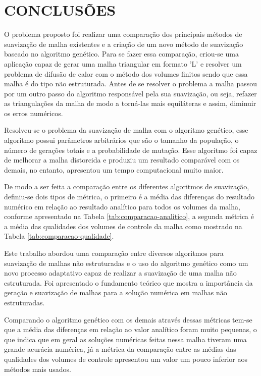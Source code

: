 \chapter[CONCLUSÕES]{CONCLUSÕES}

O problema proposto foi realizar uma comparação dos principais métodos de suavização de malha existentes e a criação de um novo método de suavização baseado no algoritmo genético. Para se fazer essa comparação, criou-se uma aplicação capaz de gerar uma malha triangular em formato 'L' e resolver um problema de difusão de calor com o método dos volumes finitos sendo que essa malha é do tipo não estruturada. Antes de se resolver o problema a malha passou por um outro passo do algoritmo responsável pela sua suavização, ou seja, refazer as triangulações da malha de modo a torná-las mais equiláteras e assim, diminuir os erros numéricos.

Resolveu-se o problema da suavização de malha com o algoritmo genético, esse algoritmo possui parâmetros arbitrários que são o tamanho da população, o número de gerações totais e a probabilidade de mutação. Esse algoritmo foi capaz de melhorar a malha distorcida e produziu um resultado comparável com os demais, no entanto, apresentou um tempo computacional muito maior.

De modo a ser feita a comparação entre os diferentes algoritmos de suavização, definiu-se dois tipos de métrica, o primeiro é a média das diferenças do resultado numérico em relação ao resultado analítico para todos os volumes da malha, conforme apresentado na Tabela \ref{tab:comparacao-analitico}, a segunda métrica é a média das qualidades dos volumes de controle da malha como mostrado na Tabela \ref{tab:comparacao-qualidade}.

Este trabalho abordou uma comparação entre diversos algoritmos para suavização de malhas não estruturadas e o uso do algoritmo genético como um novo processo adaptativo capaz de realizar a suavização de uma malha não estruturada. Foi apresentado o fundamento teórico que mostra a importância da geração e suavização de malhas para a solução numérica em malhas não estruturadas.

Comparando o algoritmo genético com os demais através dessas métricas tem-se que a média das diferenças em relação ao valor analítico foram muito pequenas, o que indica que em geral as soluções numéricas feitas nessa malha tiveram uma grande acurácia numérica, já a métrica da comparação entre as médias das qualidades dos volumes de controle apresentou um valor um pouco inferior aos métodos mais usados.

